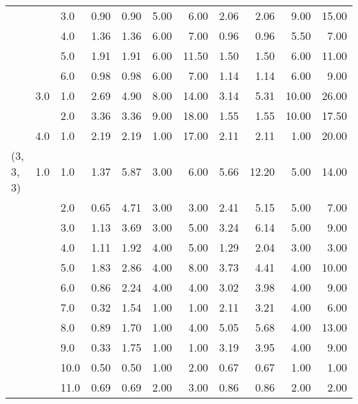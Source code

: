 \begin{tabular}{lllrrrrrrrr}
          &     & 3.0  &       0.90 &      0.90 &  5.00 &   6.00 &       2.06 &      2.06 &  9.00 &  15.00 \\
          &     & 4.0  &       1.36 &      1.36 &  6.00 &   7.00 &       0.96 &      0.96 &  5.50 &   7.00 \\
          &     & 5.0  &       1.91 &      1.91 &  6.00 &  11.50 &       1.50 &      1.50 &  6.00 &  11.00 \\
          &     & 6.0  &       0.98 &      0.98 &  6.00 &   7.00 &       1.14 &      1.14 &  6.00 &   9.00 \\
          & 3.0 & 1.0  &       2.69 &      4.90 &  8.00 &  14.00 &       3.14 &      5.31 & 10.00 &  26.00 \\
          &     & 2.0  &       3.36 &      3.36 &  9.00 &  18.00 &       1.55 &      1.55 & 10.00 &  17.50 \\
          & 4.0 & 1.0  &       2.19 &      2.19 &  1.00 &  17.00 &       2.11 &      2.11 &  1.00 &  20.00 \\
(3, 3, 3) & 1.0 & 1.0  &       1.37 &      5.87 &  3.00 &   6.00 &       5.66 &     12.20 &  5.00 &  14.00 \\
          &     & 2.0  &       0.65 &      4.71 &  3.00 &   3.00 &       2.41 &      5.15 &  5.00 &   7.00 \\
          &     & 3.0  &       1.13 &      3.69 &  3.00 &   5.00 &       3.24 &      6.14 &  5.00 &   9.00 \\
          &     & 4.0  &       1.11 &      1.92 &  4.00 &   5.00 &       1.29 &      2.04 &  3.00 &   3.00 \\
          &     & 5.0  &       1.83 &      2.86 &  4.00 &   8.00 &       3.73 &      4.41 &  4.00 &  10.00 \\
          &     & 6.0  &       0.86 &      2.24 &  4.00 &   4.00 &       3.02 &      3.98 &  4.00 &   9.00 \\
          &     & 7.0  &       0.32 &      1.54 &  1.00 &   1.00 &       2.11 &      3.21 &  4.00 &   6.00 \\
          &     & 8.0  &       0.89 &      1.70 &  1.00 &   4.00 &       5.05 &      5.68 &  4.00 &  13.00 \\
          &     & 9.0  &       0.33 &      1.75 &  1.00 &   1.00 &       3.19 &      3.95 &  4.00 &   9.00 \\
          &     & 10.0 &       0.50 &      0.50 &  1.00 &   2.00 &       0.67 &      0.67 &  1.00 &   1.00 \\
          &     & 11.0 &       0.69 &      0.69 &  2.00 &   3.00 &       0.86 &      0.86 &  2.00 &   2.00 \\

\end{tabular}
